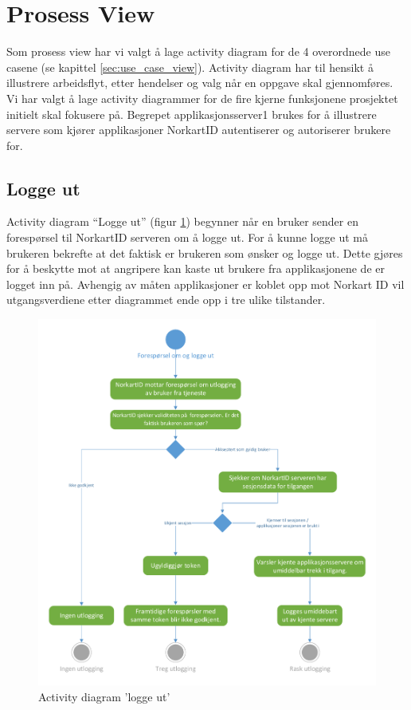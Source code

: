 \section{Prosess View}
\label{sec:prosess_view}
\newline Som prosess view har vi valgt å lage activity diagram for de 4 overordnede use casene (se kapittel \ref{sec:use_case_view}). Activity diagram har til hensikt å illustrere arbeidsflyt, etter hendelser og valg når en oppgave skal gjennomføres. Vi har valgt å lage activity diagrammer for de fire kjerne funksjonene prosjektet initielt skal fokusere på.
\newline
\newline Begrepet applikasjonsserver1 brukes for å illustrere servere som kjører applikasjoner NorkartID autentiserer og autoriserer brukere for.
\newline

\subsection{Logge ut}
\label{subsec:prosess_view_logge_ut}
Activity diagram “Logge ut” (figur \ref{fig:ProsessViewLoggeUt}) begynner når en bruker sender en forespørsel til NorkartID serveren om å logge ut. For å kunne logge ut må brukeren bekrefte at det faktisk er brukeren som ønsker og logge ut. Dette gjøres for å beskytte mot at angripere kan kaste ut brukere fra  applikasjonene de er logget inn på. Avhengig av måten applikasjoner er koblet opp mot Norkart ID vil utgangsverdiene etter diagrammet ende opp i tre ulike tilstander. 

\begin{figure}[H]
\centering
    \includegraphics[scale=0.65]{graphics/04-arkitektur/ProsessViewLoggeUt}
    \caption{Activity diagram 'logge ut' }
    \label{fig:ProsessViewLoggeUt}
\end{figure}

